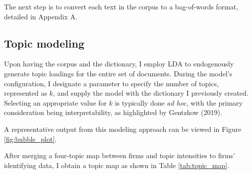 \documentclass[12pt, letterpaper]{article}
\begin{document}
The next step is to convert each text in the corpus to a bag-of-words format, detailed in Appendix A.



 


%






\subsection{Topic modeling}

Upon having the corpus and the dictionary, I employ LDA to endogenously generate topic loadings for the entire set of documents. During the model's configuration, I designate a parameter to specify the number of topics, represented as \(k\), and supply the model with the dictionary I previously created. Selecting an appropriate value for \(k\) is typically done \textit{ad hoc}, with the primary consideration being interpretability, as highlighted by Gentzkow (2019).

A representative output from this modeling approach can be viewed in Figure \ref{fig:bubble_plot}.



After merging a four-topic map between firms and topic intensities to firms' identifying data, I obtain a topic map as shown in Table \ref{tab:topic_map}.
\end{document}
